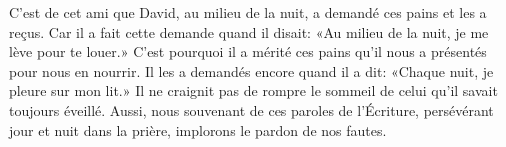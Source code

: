 C’est de cet ami que David, au milieu de la nuit,
	a demandé ces pains et les a reçus.
Car il a fait cette demande quand il disait:
	«Au milieu de la nuit, je me lève pour te louer.»
C’est pourquoi il a mérité ces pains
	qu’il nous a présentés pour nous en nourrir.
Il les a demandés encore quand il a dit:
	«Chaque nuit, je pleure sur mon lit.»
Il ne craignit pas de rompre le sommeil
		de celui qu’il savait toujours éveillé.
Aussi, nous souvenant de ces paroles de l’Écriture,
	persévérant jour et nuit dans la prière,
	implorons le pardon de nos fautes.
